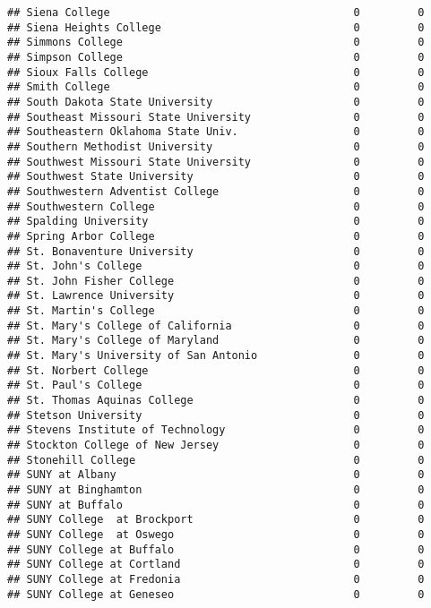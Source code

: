 \documentclass[
]{article}
\begin{document}
\begin{verbatim}
## Siena College                                      0         0
## Siena Heights College                              0         0
## Simmons College                                    0         0
## Simpson College                                    0         0
## Sioux Falls College                                0         0
## Smith College                                      0         0
## South Dakota State University                      0         0
## Southeast Missouri State University                0         0
## Southeastern Oklahoma State Univ.                  0         0
## Southern Methodist University                      0         0
## Southwest Missouri State University                0         0
## Southwest State University                         0         0
## Southwestern Adventist College                     0         0
## Southwestern College                               0         0
## Spalding University                                0         0
## Spring Arbor College                               0         0
## St. Bonaventure University                         0         0
## St. John's College                                 0         0
## St. John Fisher College                            0         0
## St. Lawrence University                            0         0
## St. Martin's College                               0         0
## St. Mary's College of California                   0         0
## St. Mary's College of Maryland                     0         0
## St. Mary's University of San Antonio               0         0
## St. Norbert College                                0         0
## St. Paul's College                                 0         0
## St. Thomas Aquinas College                         0         0
## Stetson University                                 0         0
## Stevens Institute of Technology                    0         0
## Stockton College of New Jersey                     0         0
## Stonehill College                                  0         0
## SUNY at Albany                                     0         0
## SUNY at Binghamton                                 0         0
## SUNY at Buffalo                                    0         0
## SUNY College  at Brockport                         0         0
## SUNY College  at Oswego                            0         0
## SUNY College at Buffalo                            0         0
## SUNY College at Cortland                           0         0
## SUNY College at Fredonia                           0         0
## SUNY College at Geneseo                            0         0

\end{verbatim}
\end{document}
